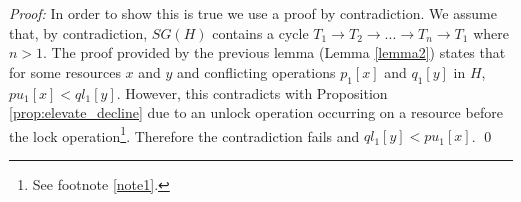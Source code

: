 \documentclass[conference]{IEEEtran}
\begin{document}
\textit{Proof:} In order to show this is true we use a proof by contradiction. We assume that, by contradiction, $SG(H)$ contains a cycle $T_{1} \rightarrow T_{2} \rightarrow ... \rightarrow T_{n} \rightarrow T_{1}$ where $n > 1$. The proof provided by the previous lemma (Lemma \ref{lemma2}) states that for some resources $x$ and $y$ and conflicting operations $p_{1}[x]$ and $q_{1}[y]$ in $H$, $pu_{1}[x] < ql_{1}[y]$. However, this contradicts with Proposition \ref{prop:elevate_decline} due to an unlock operation occurring on a resource before the lock operation\footnote{See footnote \ref{note1}.}. Therefore the contradiction fails and $ql_{1}[y] < pu_{1}[x]$. \qed


\end{document}
